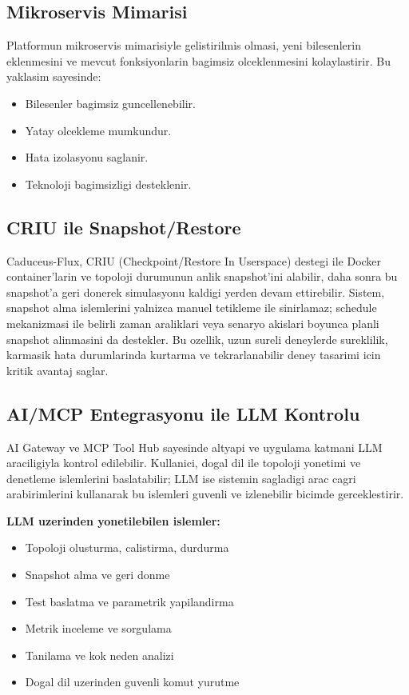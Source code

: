 \documentclass[conference]{IEEEtran}
\begin{document}
\subsection{Mikroservis Mimarisi}
Platformun mikroservis mimarisiyle gelistirilmis olmasi, yeni bilesenlerin eklenmesini ve mevcut fonksiyonlarin bagimsiz olceklenmesini kolaylastirir. Bu yaklasim sayesinde:
\begin{itemize}
\item Bilesenler bagimsiz guncellenebilir.
\item Yatay olcekleme mumkundur.
\item Hata izolasyonu saglanir.
\item Teknoloji bagimsizligi desteklenir.
\end{itemize}

\subsection{CRIU ile Snapshot/Restore}
Caduceus-Flux, CRIU (Checkpoint/Restore In Userspace) destegi ile Docker container'larin ve topoloji durumunun anlik snapshot'ini alabilir, daha sonra bu snapshot'a geri donerek simulasyonu kaldigi yerden devam ettirebilir. Sistem, snapshot alma islemlerini yalnizca manuel tetikleme ile sinirlamaz; schedule mekanizmasi ile belirli zaman araliklari veya senaryo akislari boyunca planli snapshot alinmasini da destekler. Bu ozellik, uzun sureli deneylerde sureklilik, karmasik hata durumlarinda kurtarma ve tekrarlanabilir deney tasarimi icin kritik avantaj saglar.

\subsection{AI/MCP Entegrasyonu ile LLM Kontrolu}
AI Gateway ve MCP Tool Hub sayesinde altyapi ve uygulama katmani LLM araciligiyla kontrol edilebilir. Kullanici, dogal dil ile topoloji yonetimi ve denetleme islemlerini baslatabilir; LLM ise sistemin sagladigi arac cagri arabirimlerini kullanarak bu islemleri guvenli ve izlenebilir bicimde gerceklestirir.

\textbf{LLM uzerinden yonetilebilen islemler:}
\begin{itemize}
\item Topoloji olusturma, calistirma, durdurma
\item Snapshot alma ve geri donme
\item Test baslatma ve parametrik yapilandirma
\item Metrik inceleme ve sorgulama
\item Tanilama ve kok neden analizi
\item Dogal dil uzerinden guvenli komut yurutme
\end{itemize}
\end{document}
